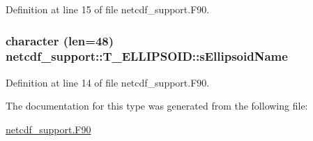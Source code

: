 Definition at line 15 of file netcdf\_\-support.F90.

\hypertarget{typenetcdf__support_1_1_t___e_l_l_i_p_s_o_i_d_a22343dc73ba3b01e26c2a3c4a7693697}{
\subsubsection[{sEllipsoidName}]{\setlength{\rightskip}{0pt plus 5cm}character (len=48) {\bf netcdf\_\-support::T\_\-ELLIPSOID::sEllipsoidName}}}
\label{typenetcdf__support_1_1_t___e_l_l_i_p_s_o_i_d_a22343dc73ba3b01e26c2a3c4a7693697}


Definition at line 14 of file netcdf\_\-support.F90.



The documentation for this type was generated from the following file:\begin{DoxyCompactItemize}
\item 
\hyperlink{netcdf__support_8_f90}{netcdf\_\-support.F90}\end{DoxyCompactItemize}
